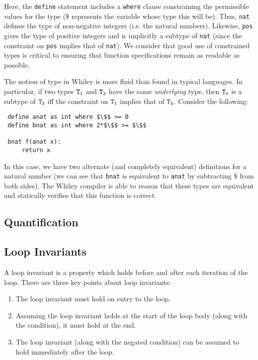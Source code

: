 Here, the \lstinline{define} statement includes a \lstinline{where}
clause constraining the permissible values for the type ($\$$
represents the variable whose type this will be).  Thus,
\lstinline{nat} defines the type of non-negative integers (i.e. the
natural numbers).  Likewise, \lstinline{pos} gives the type of
positive integers and is implicitly a subtype of \lstinline{nat}
(since the constraint on \lstinline{pos} implies that of
\lstinline{nat}).  We consider that good use of constrained types is
critical to ensuring that function specifications remain as readable
as possible.

The notion of type in Whiley is more fluid than found in typical
languages.  In particular, if two types ${\tt T_1}$ and ${\tt T_2}$
have the same {\em underlying} type, then ${\tt T_1}$ is a subtype of
${\tt T_2}$ iff the constraint on ${\tt T_1}$ implies that of ${\tt
  T_2}$.  Consider the following:

\begin{lstlisting}
 define anat as int where $\$$ >= 0
 define bnat as int where 2*$\$$ >= $\$$

 bnat f(anat x):
     return x
\end{lstlisting}
In this case, we have two alternate (and completely equivalent)
definitions for a natural number (we can see that \lstinline{bnat} is
equivalent to \lstinline{anat} by subtracting $\$$ from both sides).
The Whiley compiler is able to reason that these types are equivalent
and statically verifies that this function is correct.

\subsection{Quantification}
\subsection{Loop Invariants}
\label{loop_invariants}

A loop invariant is a property which
holds before and after each iteration of the loop.  There are three
key points about loop invariants:
\begin{enumerate}
\item The loop invariant must hold on entry to the loop.
\item Assuming the loop invariant holds at the start of the loop body
  (along with the condition), it must hold at the end.
\item The loop invariant (along with the negated condition) can be
  assumed to hold immediately after the loop.
\end{enumerate}

